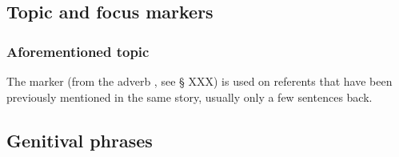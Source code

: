  \subsection{Topic and focus markers} \label{sec:topic}
 
 \subsubsection{Aforementioned topic} \label{sec:iCqha}
 The marker  (from the adverb , see § XXX)  is used on referents that have been previously mentioned in the same story, usually only a few sentences back.
 
 
%
%
 
\subsection{Genitival phrases}
%
%
